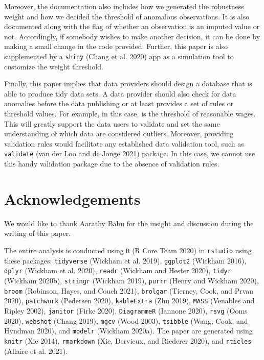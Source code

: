 \documentclass{article}
\begin{document}
Moreover, the documentation also includes how we generated the robustness weight and how we decided the threshold of anomalous observations. It is also documented along with the flag of whether an observation is an imputed value or not. Accordingly, if somebody wishes to make another decision, it can be done by making a small change in the code provided. Further, this paper is also supplemented by a \texttt{shiny} (Chang et al. 2020) app as a simulation tool to customize the weight threshold.

Finally, this paper implies that data providers should design a database that is able to produce tidy data sets. A data provider should also check for data anomalies before the data publishing or at least provides a set of rules or threshold values. For example, in this case, is the threshold of reasonable wages. This will greatly support the data users to validate and set the same understanding of which data are considered outliers. Moreover, providing validation rules would facilitate any established data validation tool, such as \texttt{validate} (van der Loo and de Jonge 2021) package. In this case, we cannot use this handy validation package due to the absence of validation rules.

\hypertarget{acknowledgements}{%
\section{Acknowledgements}\label{acknowledgements}}

We would like to thank Aarathy Babu for the insight and discussion during the writing of this paper.

The entire analysis is conducted using \texttt{R} (R Core Team 2020) in \texttt{rstudio} using these packages: \texttt{tidyverse} (Wickham et al. 2019), \texttt{ggplot2} (Wickham 2016), \texttt{dplyr} (Wickham et al. 2020), \texttt{readr} (Wickham and Hester 2020), \texttt{tidyr} (Wickham 2020b), \texttt{stringr} (Wickham 2019), \texttt{purrr} (Henry and Wickham 2020), \texttt{broom} (Robinson, Hayes, and Couch 2021), \texttt{brolgar} (Tierney, Cook, and Prvan 2020), \texttt{patchwork} (Pedersen 2020), \texttt{kableExtra} (Zhu 2019), \texttt{MASS} (Venables and Ripley 2002), \texttt{janitor} (Firke 2020), \texttt{DiagrammeR} (Iannone 2020), \texttt{rsvg} (Ooms 2020), \texttt{webshot} (Chang 2019), \texttt{mgcv} (Wood 2003), \texttt{tsibble} (Wang, Cook, and Hyndman 2020), and \texttt{modelr} (Wickham 2020a). The paper are generated using \texttt{knitr} (Xie 2014), \texttt{rmarkdown} (Xie, Dervieux, and Riederer 2020), and \texttt{rticles} (Allaire et al. 2021).
\end{document}
